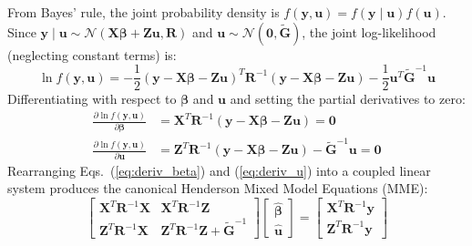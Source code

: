 \documentclass[11pt,twoside,openright]{book}
\begin{document}
From Bayes' rule, the joint probability density is $f(\mathbf{y}, \mathbf{u}) = f(\mathbf{y} \mid \mathbf{u}) f(\mathbf{u})$. Since $\mathbf{y} \mid \mathbf{u} \sim \mathcal{N}(\mathbf{X}\boldsymbol{\beta} + \mathbf{Z}\mathbf{u}, \mathbf{R})$ and $\mathbf{u} \sim \mathcal{N}(\mathbf{0}, \widetilde{\mathbf{G}})$, the joint log-likelihood (neglecting constant terms) is:
\begin{equation}
\label{eq:joint_loglik}
\ln f(\mathbf{y}, \mathbf{u}) = -\frac{1}{2} (\mathbf{y} - \mathbf{X}\boldsymbol{\beta} - \mathbf{Z}\mathbf{u})^T \mathbf{R}^{-1} (\mathbf{y} - \mathbf{X}\boldsymbol{\beta} - \mathbf{Z}\mathbf{u}) - \frac{1}{2} \mathbf{u}^T \widetilde{\mathbf{G}}^{-1} \mathbf{u}
\end{equation}
Differentiating with respect to $\boldsymbol{\beta}$ and $\mathbf{u}$ and setting the partial derivatives to zero:
\begin{align}
\frac{\partial \ln f(\mathbf{y}, \mathbf{u})}{\partial \boldsymbol{\beta}} &= \mathbf{X}^T \mathbf{R}^{-1} (\mathbf{y} - \mathbf{X}\boldsymbol{\beta} - \mathbf{Z}\mathbf{u}) = \mathbf{0} \label{eq:deriv_beta} \\
\frac{\partial \ln f(\mathbf{y}, \mathbf{u})}{\partial \mathbf{u}} &= \mathbf{Z}^T \mathbf{R}^{-1} (\mathbf{y} - \mathbf{X}\boldsymbol{\beta} - \mathbf{Z}\mathbf{u}) - \widetilde{\mathbf{G}}^{-1} \mathbf{u} = \mathbf{0} \label{eq:deriv_u}
\end{align}
Rearranging Eqs.~(\ref{eq:deriv_beta}) and (\ref{eq:deriv_u}) into a coupled linear system produces the canonical Henderson Mixed Model Equations (MME):
\begin{equation}
\label{eq:henderson_mme}
\begin{bmatrix} 
\mathbf{X}^T \mathbf{R}^{-1} \mathbf{X} & \mathbf{X}^T \mathbf{R}^{-1} \mathbf{Z} \\ 
\mathbf{Z}^T \mathbf{R}^{-1} \mathbf{X} & \mathbf{Z}^T \mathbf{R}^{-1} \mathbf{Z} + \widetilde{\mathbf{G}}^{-1} 
\end{bmatrix} 
\begin{bmatrix} 
\hat{\boldsymbol{\beta}} \\ 
\hat{\mathbf{u}} 
\end{bmatrix} 
= 
\begin{bmatrix} 
\mathbf{X}^T \mathbf{R}^{-1} \mathbf{y} \\ 
\mathbf{Z}^T \mathbf{R}^{-1} \mathbf{y} 
\end{bmatrix}
\end{equation}
\end{document}
